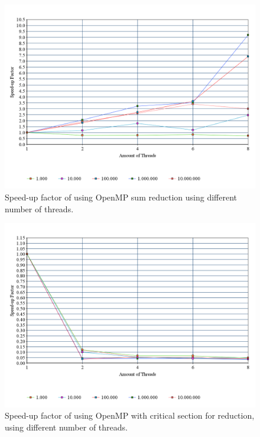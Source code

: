 \documentclass[a4paper,12px]{article}
\begin{document}
\begin{figure}[H]
    \centering
    \includegraphics[width=\textwidth]{sum}
    \caption{Speed-up factor of using OpenMP sum reduction using different
    number of threads.}
\end{figure}


\begin{figure}[H]
    \centering
    \includegraphics[width=\textwidth]{reduce}
    \caption{Speed-up factor of using OpenMP with critical section for
    reduction, using different number of threads.}
\end{figure}
\end{document}
